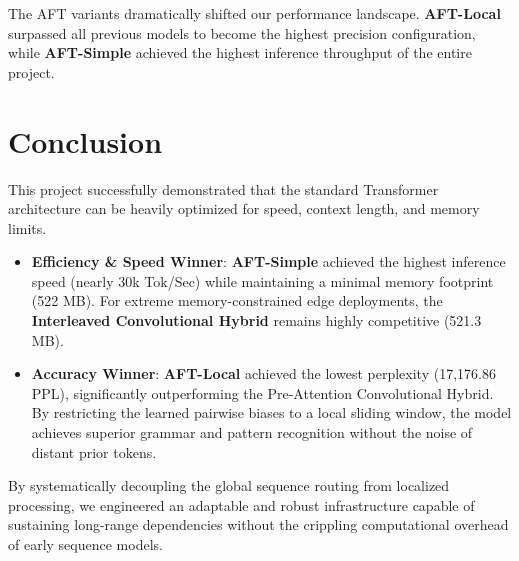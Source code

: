 \documentclass[11pt,a4paper]{article}
\begin{document}
The AFT variants dramatically shifted our performance landscape. \textbf{AFT-Local} surpassed all previous models to become the highest precision configuration, while \textbf{AFT-Simple} achieved the highest inference throughput of the entire project.

\section{Conclusion}

This project successfully demonstrated that the standard Transformer architecture can be heavily optimized for speed, context length, and memory limits. 

\begin{itemize}
    \item \textbf{Efficiency \& Speed Winner}: \textbf{AFT-Simple} achieved the highest inference speed (nearly 30k Tok/Sec) while maintaining a minimal memory footprint (522 MB). For extreme memory-constrained edge deployments, the \textbf{Interleaved Convolutional Hybrid} remains highly competitive (521.3 MB).
    \item \textbf{Accuracy Winner}: \textbf{AFT-Local} achieved the lowest perplexity (17,176.86 PPL), significantly outperforming the Pre-Attention Convolutional Hybrid. By restricting the learned pairwise biases to a local sliding window, the model achieves superior grammar and pattern recognition without the noise of distant prior tokens.
\end{itemize}

By systematically decoupling the global sequence routing from localized processing, we engineered an adaptable and robust infrastructure capable of sustaining long-range dependencies without the crippling computational overhead of early sequence models.
\end{document}
